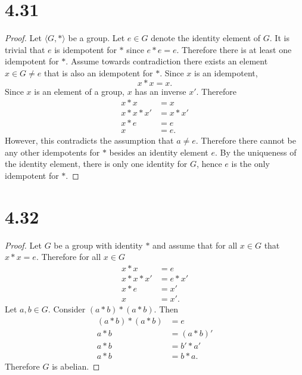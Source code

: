 \documentclass[12pt]{extarticle}
\begin{document}
\section*{4.31}
\begin{proof}
	Let $\langle G, * \rangle$ be a group. Let $e \in G$ denote the identity element of $G$. It is trivial that $e$ is idempotent for $*$ since $e * e = e$. Therefore there is at least one idempotent for $*$. Assume towards contradiction there exists an element $x \in G \neq e$ that is also an idempotent for $*$. Since $x$ is an idempotent,
	\[
		x * x = x
	.\]
	Since $x$ is an element of a group, $x$ has an inverse $x'$. Therefore
	\begin{align*}
		x * x &= x \\
		x * x * x' &= x * x' \\
		x * e &= e \\
		x &= e
	.\end{align*}
	However, this contradicts the assumption that $a \neq e$. Therefore there cannot be any other idempotents for $*$ besides an identity element $e$. By the uniqueness of the identity element, there is only one identity for $G$, hence $e$ is the only idempotent for $*$.
\end{proof}

\section*{4.32}
\begin{proof}
	Let $G$ be a group with identity $*$ and assume that for all $x \in G$ that $x * x = e$. Therefore for all $x \in G$
	\begin{align*}
		x * x &= e \\
		x * x * x' &= e * x' \\
		x * e &= x' \\
		x &= x'
	.\end{align*}
	Let $a,b \in G$. Consider $(a*b) * (a*b)$. Then
	\begin{align*}
		(a*b) * (a*b) &= e \\
		a*b &= (a*b)' \\
		a*b &= b'*a' \\
		a*b &= b*a
	.\end{align*}
	Therefore $G$ is abelian.
\end{proof}
\end{document}
